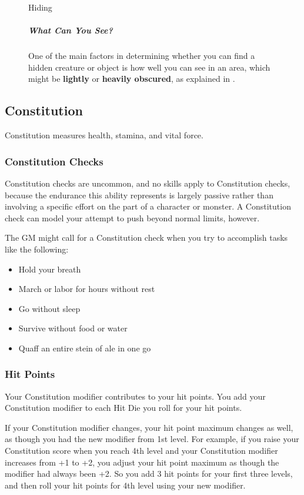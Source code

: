 \begin{figure}[htb]
\begin{DndSidebar}{Hiding}
\subparagraph*{What Can You See?} One of the main factors in determining whether you can find a hidden creature or object is how well you can see in an area, which might be \textbf{lightly} or \textbf{heavily obscured}, as explained in .
\end{DndSidebar}
\end{figure}
\subsection{Constitution}

Constitution measures health, stamina, and vital force.

\subsubsection{Constitution Checks}

Constitution checks are uncommon, and no skills apply to Constitution checks, because the endurance this ability represents is largely passive rather than involving a specific effort on the part of a character or monster. A Constitution check can model your attempt to push beyond normal limits, however.

The GM might call for a Constitution check when you try to accomplish tasks like the following:

\begin{itemize}
\item Hold your breath
\item March or labor for hours without rest
\item Go without sleep
\item Survive without food or water
\item Quaff an entire stein of ale in one go
\end{itemize}

\subsubsection{Hit Points}

Your Constitution modifier contributes to your hit points. You add your Constitution modifier to each Hit Die you roll for your hit points.

If your Constitution modifier changes, your hit point maximum changes as well, as though you had the new modifier from 1st level. For example, if you raise your Constitution score when you reach 4th level and your Constitution modifier increases from +1 to +2, you adjust your hit point maximum as though the modifier had always been +2. So you add 3 hit points for your first three levels, and then roll your hit points for 4th level using your new modifier.

